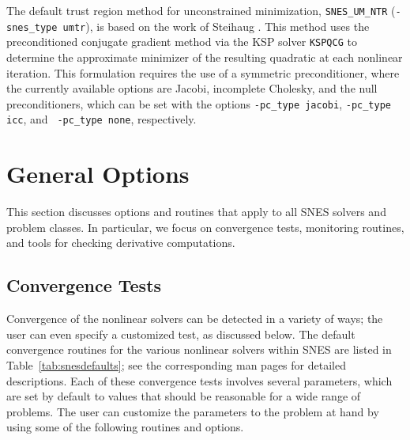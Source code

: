 The default trust region method for unconstrained minimization, 
{\tt SNES\_UM\_NTR} ({\tt -snes\_type umtr}), is based on the work of
Steihaug \cite{steihaug:83}.  This method uses the preconditioned
conjugate gradient method via the KSP solver {\tt KSPQCG} to determine
the approximate minimizer of the resulting quadratic at each nonlinear
iteration.  This formulation requires the use of a symmetric
preconditioner, where the currently available options are Jacobi,
incomplete Cholesky, and the null preconditioners, which can be set
with the options {\tt -pc\_type jacobi}, {\tt -pc\_type icc}, and {\tt
-pc\_type none}, respectively.

\section{General Options}

This section discusses options and routines that apply to all SNES
solvers and problem classes.  In particular, we focus on convergence
tests, monitoring routines, and tools for checking derivative
computations.

\subsection{Convergence Tests}
\label{sec:snesconvergence}

Convergence of the nonlinear solvers can be detected in a variety of
ways; the user can even specify a customized test, as discussed
below.  The default convergence routines for
the various nonlinear solvers within SNES are listed in
Table~\ref{tab:snesdefaults}; see the corresponding man pages for
detailed descriptions.  Each of these convergence tests involves
several parameters, which are set by default to values that should be
reasonable for a wide range of problems.  The user can customize the
parameters to the problem at hand by using some of the following
routines and options.

